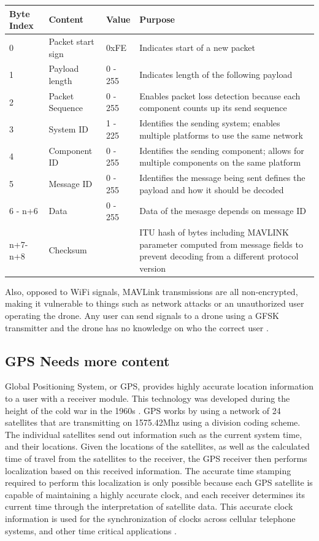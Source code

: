 \begin{table}[ht]
\centering
\begin{tabular}{|l|l|l|l|}
  \hline
  Byte Index & Content & Value &  Purpose \\ \hline
          0 &	Packet start sign &                  0xFE &       Indicates start of a new packet\\
          1 &   Payload length &                0 - 255 &       Indicates length of the following payload \\
          2 &   Packet Sequence &               0 - 255 &       Enables packet loss detection because each component counts up its send sequence \\
          3 &   System ID &            1 - 225 &  Identifies the sending system; enables multiple platforms to use the same network \\
          4 &   Component ID &         0 - 255 &  Identifies the sending component; allows for multiple components on the same platform \\
          5 &	Message ID &		   0 - 255 &  Identifies the message being sent defines the payload and how it should be decoded \\
          6 - n+6 &	Data & 			   0 - 255 & Data of the mesasge depends on message ID \\
          n+7-n+8 & Checksum & & ITU hash of bytes including MAVLINK parameter computed from message fields to prevent decoding from a different protocol version \\ \hline
\end{tabular}\end{table}
\par
Also, opposed to WiFi signals, MAVLink transmissions are all non-encrypted, making it vulnerable to things such as network attacks or an unauthorized user operating the drone. Any user can send signals to a drone using a GFSK transmitter and the drone has no knowledge on who the correct user \cite{mavlink_vuln}.

\subsection{GPS \textbf{Needs more content}}
Global Positioning System, or GPS, provides highly accurate location information to a user with a receiver module. This technology was developed during the height of the cold war in the 1960s \cite{gps_info}. GPS works by using a network of 24 satellites that are transmitting on 1575.42Mhz using a division coding scheme. The individual satellites send out information such as the current system time, and their locations. Given the locations of the satellites, as well as the calculated time of travel from the satellites to the receiver, the GPS receiver then performs localization based on this received information. The accurate time stamping required to perform this localization is only possible because each GPS satellite is capable of maintaining a highly accurate clock, and each receiver determines its current time through the interpretation of satellite data. This accurate clock information is used for the synchronization of clocks across cellular telephone systems, and other time critical applications \cite{GPS_Book}.

